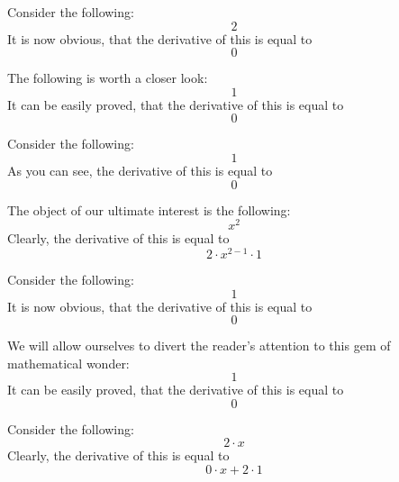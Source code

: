 \documentclass{article}
\begin{document}
Consider the following:
\begin{equation}
2 
\end{equation}
It is now obvious, that the derivative of this is equal to
\begin{equation}
0 
\end{equation}

The following is worth a closer look:
\begin{equation}
1 
\end{equation}
It can be easily proved, that the derivative of this is equal to
\begin{equation}
0 
\end{equation}

Consider the following:
\begin{equation}
1 
\end{equation}
As you can see, the derivative of this is equal to
\begin{equation}
0 
\end{equation}

The object of our ultimate interest is the following:
\begin{equation}
x ^{2 } 
\end{equation}
Clearly, the derivative of this is equal to
\begin{equation}
2 \cdot x ^{2 - 1 } \cdot 1 
\end{equation}

Consider the following:
\begin{equation}
1 
\end{equation}
It is now obvious, that the derivative of this is equal to
\begin{equation}
0 
\end{equation}

We will allow ourselves to divert the reader's attention to this gem of mathematical wonder:
\begin{equation}
1 
\end{equation}
It can be easily proved, that the derivative of this is equal to
\begin{equation}
0 
\end{equation}

Consider the following:
\begin{equation}
2 \cdot x 
\end{equation}
Clearly, the derivative of this is equal to
\begin{equation}
0 \cdot x + 2 \cdot 1 
\end{equation}
\end{document}

